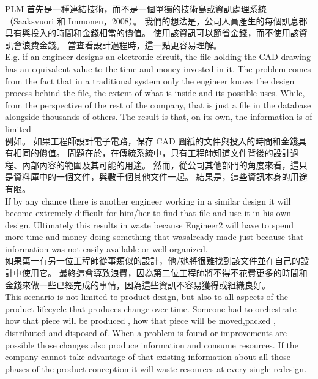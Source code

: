 \fontsize{14pt}{5pt}\sectionef
 {PLM 首先是一種連結技術，而不是一個單獨的技術島或資訊處理系統（Saaksvuori 和 Immonen，2008）。 我們的想法是，公司人員產生的每個訊息都具有與投入的時間和金錢相當的價值。 使用該資訊可以節省金錢，而不使用該資訊會浪費金錢。 當查看設計過程時，這一點更容易理解。}\\[15pt]

\fontsize{14pt}{2.5pt}\sectionef 
{E.g. if an engineer designs an electronic circuit, the file holding the CAD drawing has an equivalent value to the time and money invested in it. The problem comes from the fact that in a traditional system only the engineer knows the design process behind the file, the extent of what is inside and its possible uses. While, from the perspective of the rest of the company, that is just a file in the database alongside thousands of others. The result is that, on its own, the information is of limited }\\[1pt]

\fontsize{14pt}{5pt}\sectionef
 {例如。 如果工程師設計電子電路，保存 CAD 圖紙的文件與投入的時間和金錢具有相同的價值。 問題在於，在傳統系統中，只有工程師知道文件背後的設計過程、內部內容的範圍及其可能的用途。 然而，從公司其他部門的角度來看，這只是資料庫中的一個文件，與數千個其他文件一起。 結果是，這些資訊本身的用途有限。}\\[15pt]

\fontsize{14pt}{2.5pt}\sectionef 
{If by any chance there is another engineer working in a similar design it will become extremely difficult for him/her to find that file and use it in his own design. Ultimately this results in waste because Engineer2 will have to spend more time and money doing something that wasalready made just because that information was not easily available or well organized. }\\[1pt]

\fontsize{14pt}{5pt}\sectionef
 {如果萬一有另一位工程師從事類似的設計，他/她將很難找到該文件並在自己的設計中使用它。 最終這會導致浪費，因為第二位工程師將不得不花費更多的時間和金錢來做一些已經完成的事情，因為這些資訊不容易獲得或組織良好。}\\[15pt]


\fontsize{14pt}{2.5pt}\sectionef 
{This scenario is not limited to product design, but also to all aspects of the product lifecycle that produces change over time. Someone had to orchestrate how that piece will be produced , how that piece will be moved,packed , distributed and disposed of. When a problem is found or improvements are possible those changes also produce information and consume resources. If the company cannot take advantage of that existing information about all those phases of the product conception it will waste resources at every single redesign.
}\\[1pt]

